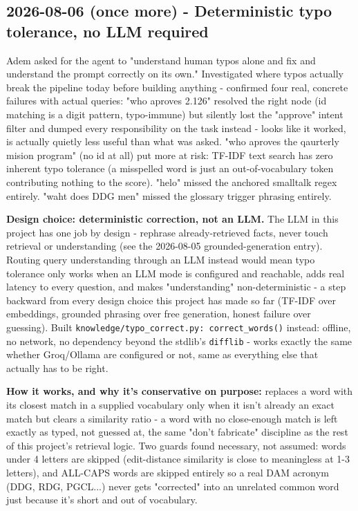 \subsection*{2026-08-06 (once more) - Deterministic typo tolerance, no LLM required}
Adem asked for the agent to "understand human typos alone and fix and understand the prompt correctly on its own." Investigated where typos actually break the pipeline today before building anything - confirmed four real, concrete failures with actual queries: "who aproves 2.126" resolved the right node (id matching is a digit pattern, typo-immune) but silently lost the "approve" intent filter and dumped every responsibility on the task instead - looks like it worked, is actually quietly less useful than what was asked. "who aproves the qaurterly mision program" (no id at all) put more at risk: TF-IDF text search has zero inherent typo tolerance (a misspelled word is just an out-of-vocabulary token contributing nothing to the score). "helo" missed the anchored smalltalk regex entirely. "waht does DDG men" missed the glossary trigger phrasing entirely.

\textbf{Design choice: deterministic correction, not an LLM.} The LLM in this project has one job by design - rephrase already-retrieved facts, never touch retrieval or understanding (see the 2026-08-05 grounded-generation entry). Routing query understanding through an LLM instead would mean typo tolerance only works when an LLM mode is configured and reachable, adds real latency to every question, and makes "understanding" non-deterministic - a step backward from every design choice this project has made so far (TF-IDF over embeddings, grounded phrasing over free generation, honest failure over guessing). Built \texttt{knowledge/\allowbreak{}typo\_\allowbreak{}correct.py: correct\_\allowbreak{}words()} instead: offline, no network, no dependency beyond the stdlib's \texttt{difflib} - works exactly the same whether Groq/Ollama are configured or not, same as everything else that actually has to be right.

\textbf{How it works, and why it's conservative on purpose:} replaces a word with its closest match in a supplied vocabulary only when it isn't already an exact match but clears a similarity ratio - a word with no close-enough match is left exactly as typed, not guessed at, the same "don't fabricate" discipline as the rest of this project's retrieval logic. Two guards found necessary, not assumed: words under 4 letters are skipped (edit-distance similarity is close to meaningless at 1-3 letters), and ALL-CAPS words are skipped entirely so a real DAM acronym (DDG, RDG, PGCL...) never gets "corrected" into an unrelated common word just because it's short and out of vocabulary.


